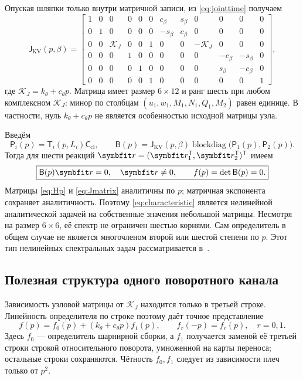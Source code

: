 \documentclass[11pt,a4paper]{article}
\numberwithin{equation}{section}
\newcommand{\kth}{k_\theta}
\newcommand{\cth}{c_\theta}
\newcommand{\KJ}{\mathcal K_J}
\newcommand{\BB}{\mathsf B}
\newcommand{\JJ}{\mathsf J}
\newcommand{\TT}{\mathsf T}
\newcommand{\PP}{\mathsf P}
\newcommand{\CC}{\mathsf C_{\mathrm{cl}}}
\begin{document}
Опуская шляпки только внутри матричной записи, из \eqref{eq:jointtime}
получаем
\begin{equation}
 \JJ_{\mathrm{KV}}(p,\beta)=
 \begin{bmatrix}
 1&0&0&0&0&0&c_\beta&s_\beta&0&0&0&0\\
 0&1&0&0&0&0&-s_\beta&c_\beta&0&0&0&0\\
 0&0&\KJ&0&0&1&0&0&-\KJ&0&0&0\\
 0&0&0&1&0&0&0&0&0&-c_\beta&-s_\beta&0\\
 0&0&0&0&1&0&0&0&0&s_\beta&-c_\beta&0\\
 0&0&0&0&0&1&0&0&0&0&0&1
 \end{bmatrix},
 \label{eq:Jmatrix}
\end{equation}
где $\KJ=\kth+\cth p$. Матрица имеет размер $6\times12$ и ранг шесть
при любом комплексном $\KJ$: минор по столбцам
$(u_1,w_1,M_1,N_1,Q_1,M_2)$ равен единице. В частности, нуль
$\kth+\cth p$ не является особенностью исходной матрицы узла.

Введём
\begin{equation}
 \PP_i(p)=\TT_i(p,L_i)\CC,
 \qquad
 \boxed{\BB(p)=\JJ_{\mathrm{KV}}(p,\beta)
 \operatorname{blockdiag}\bigl(\PP_1(p),\PP_2(p)\bigr).}
 \label{eq:Bmatrix}
\end{equation}
Тогда для шести реакций
$\symbfit r=(\symbfit r_1^{\mathsf T},\symbfit r_2^{\mathsf T})^{\mathsf T}$
имеем
\begin{equation}
 \boxed{\BB(p)\symbfit r=0,\quad \symbfit r\ne0,
 \qquad f(p)=\det\BB(p)=0.}
 \label{eq:characteristic}
\end{equation}
Матрицы \eqref{eq:Hp} и \eqref{eq:Jmatrix} аналитичны по $p$;
матричная экспонента сохраняет аналитичность. Поэтому \eqref{eq:characteristic}
является нелинейной аналитической задачей на собственные значения
небольшой матрицы. Несмотря на размер $6\times6$, её спектр не ограничен
шестью корнями. Сам определитель в общем случае не является многочленом
второй или шестой степени по $p$. Этот тип нелинейных спектральных
задач рассматривается в~\cite{guettel2017}.

\subsection{Полезная структура одного поворотного канала}

Зависимость узловой матрицы от $\KJ$ находится только в третьей строке.
Линейность определителя по строке поэтому даёт точное представление
\begin{equation}
 f(p)=f_0(p)+(\kth+\cth p)f_1(p),\qquad f_r(-p)=f_r(p),\quad r=0,1.
 \label{eq:affine}
\end{equation}
Здесь $f_0$ --- определитель шарнирной сборки, а $f_1$ получается заменой
её третьей строки строкой относительного поворота, умноженной на карты
переноса; остальные строки сохраняются. Чётность $f_0,f_1$ следует из
зависимости плеч только от $p^2$.
\end{document}
